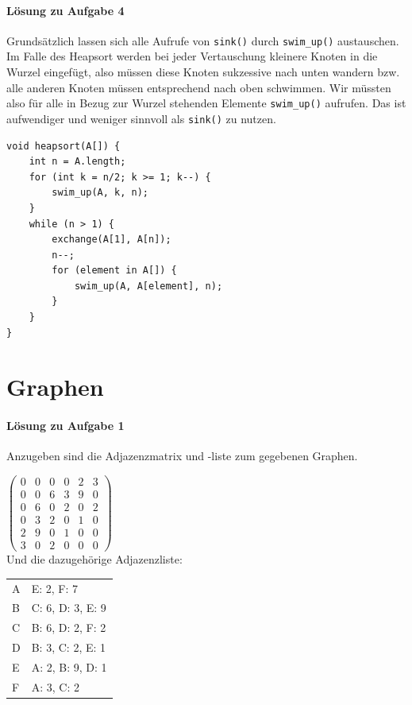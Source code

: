 \documentclass[11pt,a4paper]{scrartcl}
\begin{document}
\paragraph{Lösung zu Aufgabe 4}
\label{a5.4:lsg}
Grundsätzlich lassen sich alle Aufrufe von \texttt{sink()} durch \texttt{swim{\_}up()} austauschen. Im Falle des Heapsort werden bei jeder Vertauschung kleinere Knoten in die Wurzel eingefügt, also müssen diese Knoten sukzessive nach unten wandern bzw. alle anderen Knoten müssen entsprechend nach oben schwimmen. Wir müssten also für alle in Bezug zur Wurzel stehenden Elemente \texttt{swim{\_}up()} aufrufen. Das ist aufwendiger und weniger sinnvoll als \texttt{sink()} zu nutzen.
\begin{lstlisting}
void heapsort(A[]) {
	int n = A.length;
	for (int k = n/2; k >= 1; k--) {
		swim_up(A, k, n);
	}
	while (n > 1) {
		exchange(A[1], A[n]);
		n--;
		for (element in A[]) {
			swim_up(A, A[element], n);
		}	
	}
}
\end{lstlisting}
\section{Graphen}
\paragraph{Lösung zu Aufgabe 1}
\label{a6.1:lsg}
Anzugeben sind die Adjazenzmatrix und -liste zum gegebenen Graphen. \\
\begin{center}
$\left( \begin{array}{rrrrrr}
0 & 0 & 0 & 0 & 2 & 3 \\
0 & 0 & 6 & 3 & 9 & 0 \\
0 & 6 & 0 & 2 & 0 & 2 \\
0 & 3 & 2 & 0 & 1 & 0 \\
2 & 9 & 0 & 1 & 0 & 0 \\
3 & 0 & 2 & 0 & 0 & 0 
\end{array} \right)$ \\
Und die dazugehörige Adjazenzliste: \\
\begin{tabular}{l | l}
A & E: 2, F: 7 \\
B & C: 6, D: 3, E: 9 \\
C & B: 6, D: 2, F: 2 \\
D & B: 3, C: 2, E: 1 \\
E & A: 2, B: 9, D: 1 \\
F & A: 3, C: 2
\end{tabular}
\end{center}
\end{document}
